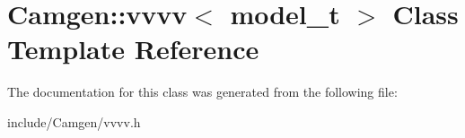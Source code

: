 \hypertarget{a00575}{\section{Camgen\-:\-:vvvv$<$ model\-\_\-t $>$ Class Template Reference}
\label{a00575}
}


The documentation for this class was generated from the following file\-:\begin{DoxyCompactItemize}
\item 
include/\-Camgen/vvvv.\-h\end{DoxyCompactItemize}
